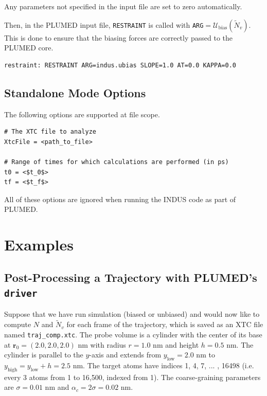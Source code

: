 \documentclass[11pt,notitlepage]{article}
\begin{document}
\noindent Any parameters not specified in the input file are set to zero automatically.


Then, in the PLUMED input file, \texttt{RESTRAINT} is called with \texttt{ARG}$ = \mathcal{U}_{\text{bias}}(\tilde{N}_v)$. This is done to ensure that the biasing forces are correctly passed to the PLUMED core.

\begin{lstlisting}
restraint: RESTRAINT ARG=indus.ubias SLOPE=1.0 AT=0.0 KAPPA=0.0
\end{lstlisting}


\subsection{Standalone Mode Options}{\label{sec:input_standalone}}

The following options are supported at file scope.

\begin{lstlisting}
# The XTC file to analyze
XtcFile = <path_to_file>

# Range of times for which calculations are performed (in ps)
t0 = <$t_0$>
tf = <$t_f$>
\end{lstlisting}

\noindent All of these options are ignored when running the INDUS code as part of PLUMED.


\section{Examples}


\subsection{Post-Processing a Trajectory with PLUMED's \texttt{driver}}

Suppose that we have run simulation (biased or unbiased) and would now like to compute $N$ and $\tilde{N}_v$ for each frame of the trajectory, which is saved as an XTC file named \texttt{traj\_comp.xtc}. The probe volume is a cylinder with the center of its base at $\mathbf{r}_0 = (2.0, 2.0, 2.0)$ nm with radius $r = 1.0$ nm and height $h = 0.5$ nm. The cylinder is parallel to the $y$-axis and extends from $y_{\text{low}} = 2.0$ nm to $y_{\text{high}} = y_{\text{low}} + h = 2.5$ nm. The target atoms have indices 1, 4, 7, ... , 16498 (i.e. every 3 atoms from 1 to 16,500, indexed from 1). The coarse-graining parameters are $\sigma = 0.01$ nm and $\alpha_c = 2 \sigma = 0.02$ nm.
\end{document}
